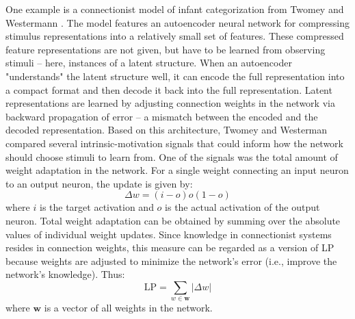 One example is a connectionist model of infant categorization from Twomey and Westermann \cite{twomey_curiosity-based_2018}. The model features an autoencoder neural network for compressing stimulus representations into a relatively small set of features. These compressed feature representations are not given, but have to be learned from observing stimuli -- here, instances of a latent structure. When an autoencoder "understands" the latent structure well, it can encode the full representation into a compact format and then decode it back into the full representation. Latent representations are learned by adjusting connection weights in the network via backward propagation of error -- a mismatch between the encoded and the decoded representation. Based on this architecture, Twomey and Westerman compared several intrinsic-motivation signals that could inform how the network should choose stimuli to learn from. One of the signals was the total amount of weight adaptation in the network. For a single weight connecting an input neuron to an output neuron, the update is given by: 
\begin{equation}
    \Delta w = (i - o)o(1-o)
\end{equation}
where $i$ is the target activation and $o$ is the actual activation of the output neuron. Total weight adaptation can be obtained by summing over the absolute values of individual weight updates. Since knowledge in connectionist systems resides in connection weights, this measure can be regarded as a version of \ac{LP} because weights are adjusted to minimize the network's error (i.e., improve the network's knowledge). Thus: 
\begin{equation}
    \mathrm{LP} = \sum_{w \in \bm{w}} |\Delta w|
\end{equation}
where $\bm{w}$ is a vector of all weights in the network.

